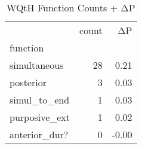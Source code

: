 \begin{table}[htbp!]
\centering
\caption{WQtH Function Counts + ΔP}
\label{table:wqth_functs}
\begin{tabular}{lrr}
\toprule
{} &  count &    ΔP \\
function      &        &       \\
\midrule
simultaneous  &     28 &  0.21 \\
posterior     &      3 &  0.03 \\
simul\_to\_end  &      1 &  0.03 \\
purposive\_ext &      1 &  0.02 \\
anterior\_dur? &      0 & -0.00 \\
\bottomrule
\end{tabular}
\end{table}
